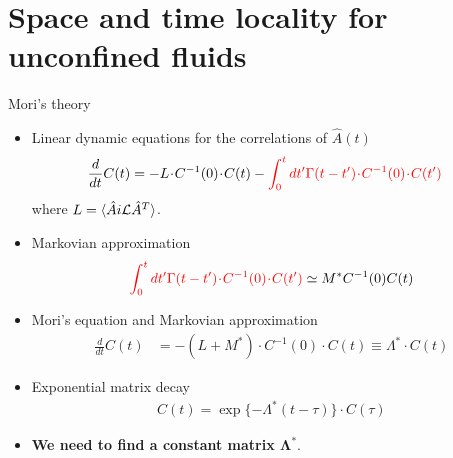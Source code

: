 \documentclass{beamer}
\newcommand{\esc}{\!\cdot\!}
\begin{document}
\section{Space and time locality for unconfined fluids}
\begin{frame}{Mori's theory}
  \begin{itemize}
    \item<1-> Linear dynamic equations for the correlations of $\hat{A}(t)$
\begin{align}
  \frac{d}{dt}C(t)&=-L\esc C^{-1}(0)\esc C(t)
  -{\color{red}\int_0^tdt' \Gamma(t-t')\esc C^{-1}(0)\esc  C(t')}
\nonumber
\end{align}
where  $L=\langle \hat{A}i{\cal L}\hat{A}^T\rangle$.

    \item Markovian approximation
  \begin{align}
{\color{red}\int_0^tdt' \Gamma(t-t')\esc C^{-1}(0)\esc  C(t')} \simeq M^* C^{-1}(0)C(t)
\nonumber
\end{align}
\item Mori's equation and Markovian approximation
\begin{align}
  \frac{d}{dt}C(t) &= - (L+M^*)\esc C^{-1}(0)\esc C(t) 
                     \equiv \Lambda^*\esc C(t)
  \nonumber
\end{align}
\item Exponential matrix decay 
\begin{align}
  C(t)=\exp\{-\Lambda^* (t-\tau)\}\esc C(\tau)
\nonumber
\end{align}
\item {\bf We need to find a constant matrix $\boldsymbol{\Lambda^*}$}.
\end{itemize}
\end{frame}
\end{document}

